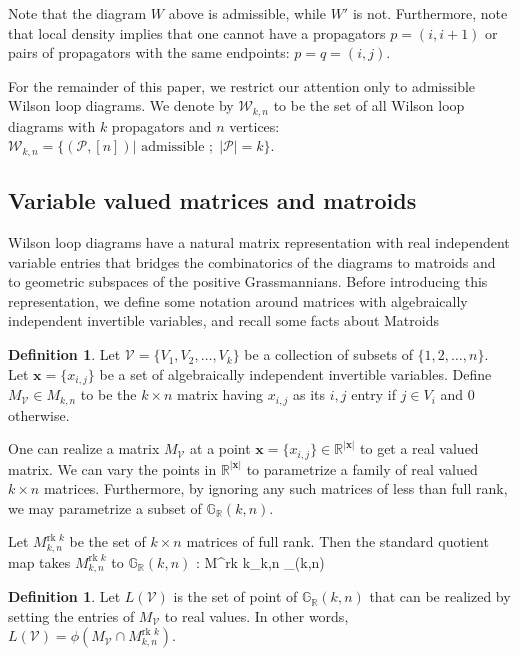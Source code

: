 \documentclass[11pt]{article}
\newcommand{\R}{\mathbb{R}}
\newcommand{\Grall}{\mathbb{G}_{\R}}
\newcommand{\rk}{\textrm{rk }}
\def\ba #1\ea{\begin{align} #1 \end{align}}
\newcommand{\cP}{\mathcal{P}}
\newcommand{\cV}{\mathcal{V}}
\newcommand{\cW}{\mathcal{W}}
\theoremstyle{remark}
\theoremstyle{definition}
\newtheorem{dfn}[thm]{Definition}
\begin{document}
Note that the diagram $W$ above is admissible, while $W'$ is not. Furthermore, note that local density implies that one cannot have a propagators $p = (i, i+1)$ or pairs of propagators with the same endpoints: $p = q = (i, j)$.

For the remainder of this paper, we restrict our attention only to admissible Wilson loop diagrams. We denote by $\cW_{k,n}$ to be the set of all Wilson loop diagrams with $k$ propagators and $n$ vertices: $\cW_{k,n} = \{ (\cP,[n])| \textrm{ admissible }; \; |\cP| = k\}$. 


\subsection{Variable valued matrices and matroids \label{sec:matrices and matroids}}

Wilson loop diagrams have a natural matrix representation with real independent variable entries that bridges the combinatorics of the diagrams to matroids and to geometric subspaces of the positive Grassmannians. Before introducing this representation, we  define some notation around matrices with algebraically independent invertible variables, and recall some facts about Matroids

\begin{dfn} \label{dfn:variablevaluedmatrix}
Let $\cV = \{V_1, V_2, \dots, V_k\}$ be a collection of subsets of $\{1,2,\dots,n\}$. Let $\mathbf{x}=\{x_{i,j}\}$ be a set of algebraically independent invertible variables. Define $M_{\mathcal{V}}\in M_{k,n}$ to be the $k \times n$ matrix having $x_{i,j}$ as its $i,j$ entry if $j \in V_i$ and $0$ otherwise.
\end{dfn}

One can realize a matrix $M_\cV$ at a point $\mathbf{x}=\{x_{i,j}\} \in \R^{|\mathbf{x}|}$ to get a real valued matrix. We can vary the points in $\R^{|\mathbf{x}|}$ to parametrize a family of real valued $k \times n$ matrices. Furthermore, by ignoring any such matrices of less than full rank, we may parametrize a subset of $\Grall(k,n)$.

Let $M^{\rk k}_{k,n}$ be the set of $k \times n$ matrices of full rank. Then the standard quotient map takes $M^{\rk k}_{k,n}$ to $\Grall(k,n)$ \ba \phi: M^{\rk k}_{k,n} \rightarrow \Grall(k,n)  \label{eq:maps}\ea

\begin{dfn} \label{dfn:loci}
  Let $L(\cV)$ is the set of point of $\Grall(k,n)$ that can be realized by setting the entries of $M_\cV$ to real values. In other words, $L(\cV) = \phi (M_{\cV} \cap M^{\rk k}_{k,n})$.  
\end{dfn}
\end{document}
